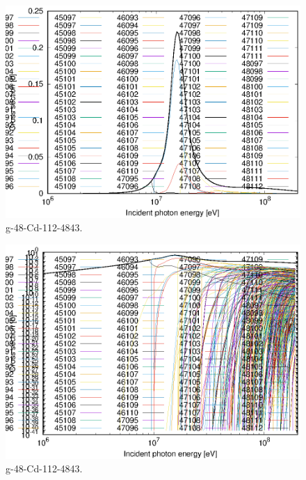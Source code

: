 \begin{figure}
 \includegraphics[width=\linewidth]{eps/g_48-Cd-112_4843.eps}
  \caption{g-48-Cd-112-4843.}
\end{figure}
\begin{figure}
 \includegraphics[width=\linewidth]{eps-log/g_48-Cd-112_4843.eps}
 \caption{g-48-Cd-112-4843.}
\end{figure}
\newpage \clearpage


